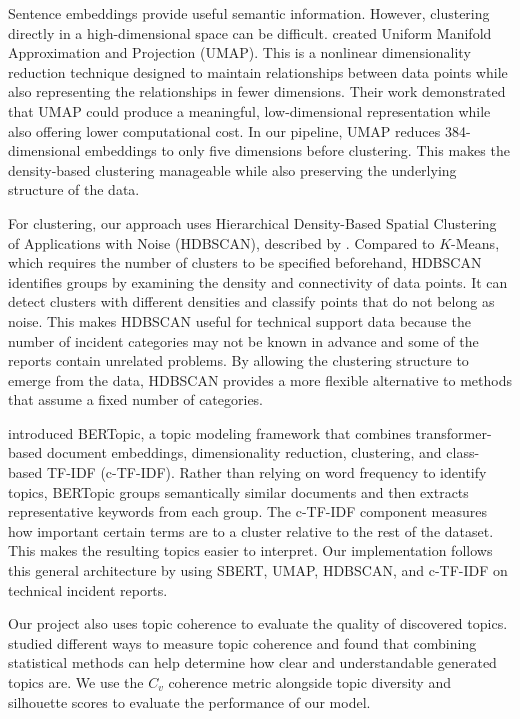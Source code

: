 \documentclass[sigconf,nonacm]{acmart}
\begin{document}
Sentence embeddings provide useful semantic information. However, clustering directly in a high-dimensional space can be difficult. \citet{mcinnes2018umap} created Uniform Manifold Approximation and Projection (UMAP). This is a nonlinear dimensionality reduction technique designed to maintain relationships between data points while also representing the relationships in fewer dimensions. Their work demonstrated that UMAP could produce a meaningful, low-dimensional representation while also offering lower computational cost. In our pipeline, UMAP reduces 384-dimensional embeddings to only five dimensions before clustering. This makes the density-based clustering manageable while also preserving the underlying structure of the data.

For clustering, our approach uses Hierarchical Density-Based Spatial Clustering of Applications with Noise (HDBSCAN), described by \citet{mcinnes2017hdbscan}. Compared to $K$-Means, which requires the number of clusters to be specified beforehand, HDBSCAN identifies groups by examining the density and connectivity of data points. It can detect clusters with different densities and classify points that do not belong as noise. This makes HDBSCAN useful for technical support data because the number of incident categories may not be known in advance and some of the reports contain unrelated problems. By allowing the clustering structure to emerge from the data, HDBSCAN provides a more flexible alternative to methods that assume a fixed number of categories.

\citet{grootendorst2022bertopic} introduced BERTopic, a topic modeling framework that combines transformer-based document embeddings, dimensionality reduction, clustering, and class-based TF-IDF (c-TF-IDF). Rather than relying on word frequency to identify topics, BERTopic groups semantically similar documents and then extracts representative keywords from each group. The c-TF-IDF component measures how important certain terms are to a cluster relative to the rest of the dataset. This makes the resulting topics easier to interpret. Our implementation follows this general architecture by using SBERT, UMAP, HDBSCAN, and c-TF-IDF on technical incident reports.

Our project also uses topic coherence to evaluate the quality of discovered topics. \citet{roder2015exploring} studied different ways to measure topic coherence and found that combining statistical methods can help determine how clear and understandable generated topics are. We use the $C_v$ coherence metric alongside topic diversity and silhouette scores to evaluate the performance of our model.
\end{document}

